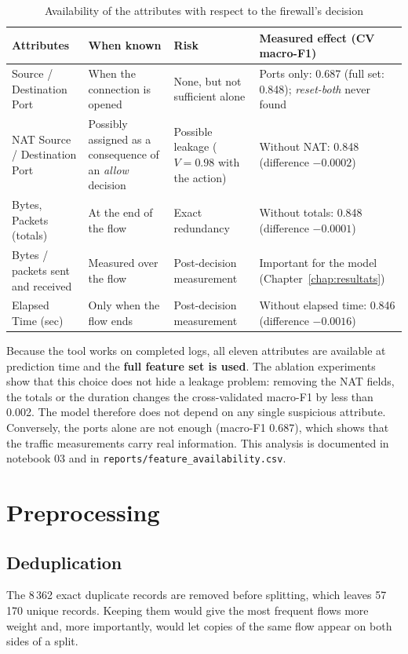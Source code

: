 \begin{table}[htbp]
  \centering
  \caption{Availability of the attributes with respect to the firewall's decision}
  \label{tab:availability}
  \small
  \begin{tabular}{|p{3.0cm}|p{3.3cm}|p{3.0cm}|p{4.3cm}|}
    \hline
    \textbf{Attributes} & \textbf{When known} & \textbf{Risk} & \textbf{Measured effect (CV macro-F1)} \\
    \hline
    Source / Destination Port & When the connection is opened & None, but not sufficient alone & Ports only: 0.687 (full set: 0.848); \emph{reset-both} never found \\
    \hline
    NAT Source / Destination Port & Possibly assigned as a consequence of an \emph{allow} decision & Possible leakage ($V = 0.98$ with the action) & Without NAT: 0.848 (difference $-0.0002$) \\
    \hline
    Bytes, Packets (totals) & At the end of the flow & Exact redundancy & Without totals: 0.848 (difference $-0.0001$) \\
    \hline
    Bytes / packets sent and received & Measured over the flow & Post-decision measurement & Important for the model (Chapter~\ref{chap:resultats}) \\
    \hline
    Elapsed Time (sec) & Only when the flow ends & Post-decision measurement & Without elapsed time: 0.846 (difference $-0.0016$) \\
    \hline
  \end{tabular}
\end{table}

Because the tool works on completed logs, all eleven attributes are available at prediction time and the \textbf{full feature set is used}. The ablation experiments show that this choice does not hide a leakage problem: removing the \ac{NAT} fields, the totals or the duration changes the cross-validated macro-F1 by less than 0.002. The model therefore does not depend on any single suspicious attribute. Conversely, the ports alone are not enough (macro-F1 0.687), which shows that the traffic measurements carry real information. This analysis is documented in notebook 03 and in \texttt{reports/feature\_availability.csv}.

\section{Preprocessing}\label{sec:preprocessing}
\subsection{Deduplication}
The 8\,362 exact duplicate records are removed before splitting, which leaves 57\,170 unique records. Keeping them would give the most frequent flows more weight and, more importantly, would let copies of the same flow appear on both sides of a split.


